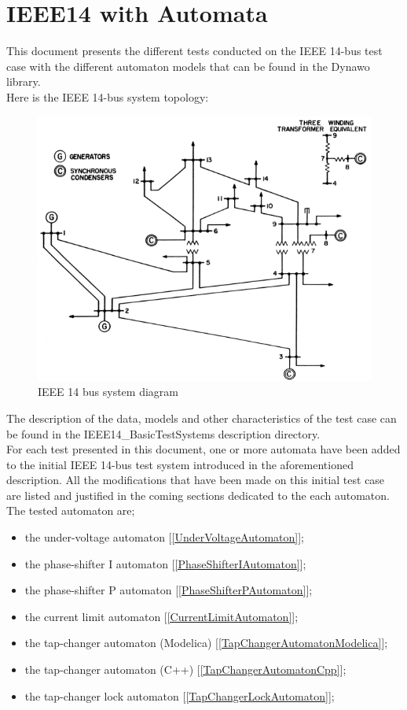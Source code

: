 \documentclass[a4paper, 12pt]{report}
\begin{document}
\chapter{IEEE14 with Automata}

This document presents the different tests conducted on the IEEE 14-bus test case with the different automaton models that can be found in the Dynawo library.\\

Here is the IEEE 14-bus system topology:
\begin{figure}[H]
  \includegraphics[width=\textwidth]{Single-line-diagram-of-IEEE-14-bus-system.png}
  \caption{IEEE 14 bus system diagram}
\end{figure}

The description of the data, models and other characteristics of the test case can be found in the IEEE14\_BasicTestSystems description directory. \\

For each test presented in this document, one or more automata have been added to the initial IEEE 14-bus test system introduced in the aforementioned description. All the modifications that have been made on this initial test case are listed and justified in the coming sections dedicated to the each automaton.\\

The tested automaton are;
\begin{itemize}
\item the under-voltage automaton [\ref{UnderVoltageAutomaton}];
\item the phase-shifter I automaton [\ref{PhaseShifterIAutomaton}];
\item the phase-shifter P automaton [\ref{PhaseShifterPAutomaton}];
\item the current limit automaton [\ref{CurrentLimitAutomaton}];
\item the tap-changer automaton (Modelica) [\ref{TapChangerAutomatonModelica}];
\item the tap-changer automaton (C++) [\ref{TapChangerAutomatonCpp}];
\item the tap-changer lock automaton [\ref{TapChangerLockAutomaton}];
\end{itemize}
\end{document}
